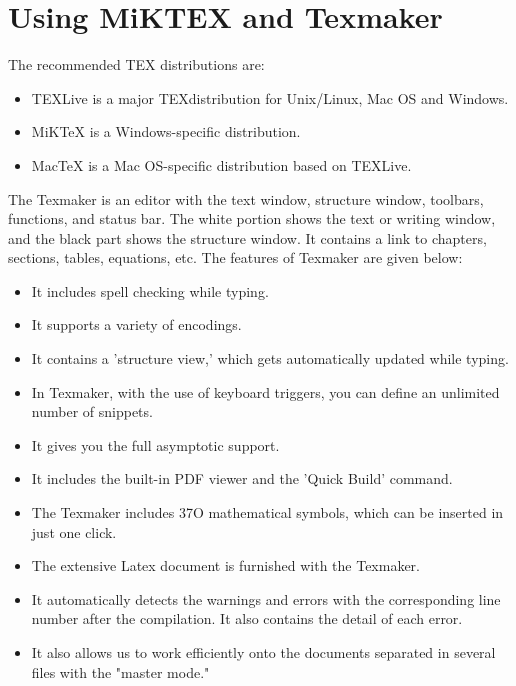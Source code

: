 \section{Using MiKTEX and Texmaker}

\noindent The recommended TEX distributions are:
\begin{itemize}
    \item TEXLive is a major TEXdistribution for Unix/Linux, Mac OS and Windows.
    \item MiKTeX is a Windows-specific distribution.
    \item MacTeX is a Mac OS-specific distribution based on TEXLive.
\end{itemize}

The Texmaker is an editor with the text window, structure window, toolbars, functions, and status bar. The white portion shows the text or writing window, and the black part shows the structure window. It contains a link to chapters, sections, tables, equations, etc. The features of Texmaker are given below:

\begin{itemize}
    \item It includes spell checking while typing.
    \item It supports a variety of encodings.
    \item It contains a 'structure view,' which gets automatically updated while typing.
    \item In Texmaker, with the use of keyboard triggers, you can define an unlimited number of snippets.
    \item It gives you the full asymptotic support.
    \item It includes the built-in PDF viewer and the 'Quick Build' command.
    \item The Texmaker includes 37O mathematical symbols, which can be inserted in just one click.
    \item The extensive Latex document is furnished with the Texmaker.
    \item It automatically detects the warnings and errors with the corresponding line number after the compilation. It also contains the detail of each error.
    \item It also allows us to work efficiently onto the documents separated in several files with the "master mode."
\end{itemize}

